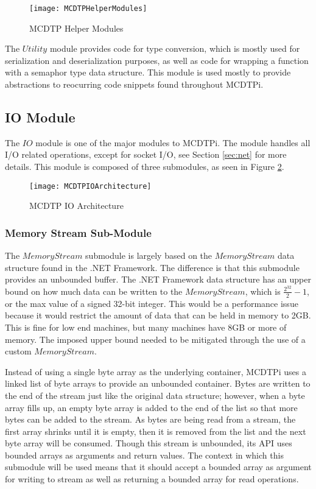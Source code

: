 \begin{figure}[ht]
\centering
\texttt{[image: MCDTPHelperModules]}
\caption{MCDTP Helper Modules}
\label{fig:mcdtp-hm}
\end{figure}

The $Utility$ module provides code for type conversion, which is mostly used for serialization and deserialization purposes, as well as code for wrapping a function with a semaphor type data structure. This module is used mostly to provide abstractions to reocurring code snippets found throughout MCDTPi.

\subsection{IO Module}

The $IO$ module is one of the major modules to MCDTPi. The module handles all I/O related operations, except for socket I/O, see Section \ref{sec:net} for more details. This module is composed of three submodules, as seen in Figure \ref{fig:mcdtp-io-arch}.

\begin{figure}[ht]
\centering
\texttt{[image: MCDTPIOArchitecture]}
\caption{MCDTP IO Architecture}
\label{fig:mcdtp-io-arch}
\end{figure}

\subsubsection{Memory Stream Sub-Module}

The $MemoryStream$ submodule is largely based on the $MemoryStream$ data structure found in the .NET Framework. The difference is that this submodule provides an unbounded buffer. The .NET Framework data structure has an upper bound on how much data can be written to the $MemoryStream$, which is $\frac{2^{32}}{2} - 1$, or the max value of a signed 32-bit integer. This would be a performance issue because it would restrict the amount of data that can be held in memory to 2GB. This is fine for low end machines, but many machines have 8GB or more of memory. The imposed upper bound needed to be mitigated through the use of a custom $MemoryStream$.

Instead of using a single byte array as the underlying container, MCDTPi uses a linked list of byte arrays to provide an unbounded container. Bytes are written to the end of the stream just like the original data structure; however, when a byte array fills up, an empty byte array is added to the end of the list so that more bytes can be added to the stream. As bytes are being read from a stream, the first array shrinks until it is empty, then it is removed from the list and the next byte array will be consumed. Though this stream is unbounded, its API uses bounded arrays as arguments and return values. The context in which this submodule will be used means that it should accept a bounded array as argument for writing to stream as well as returning a bounded array for read operations.

